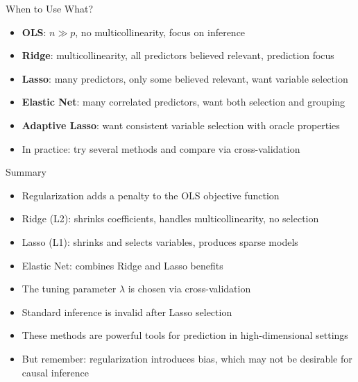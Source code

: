 \documentclass[aspectratio=169]{beamer}
\begin{document}
\begin{frame}{When to Use What?}
\begin{itemize}
    \item \textbf{OLS}: $n \gg p$, no multicollinearity, focus on inference
    \item \textbf{Ridge}: multicollinearity, all predictors believed relevant, prediction focus
    \item \textbf{Lasso}: many predictors, only some believed relevant, want variable selection
    \item \textbf{Elastic Net}: many correlated predictors, want both selection and grouping
    \item \textbf{Adaptive Lasso}: want consistent variable selection with oracle properties
    \item In practice: try several methods and compare via cross-validation
\end{itemize}
\end{frame}

\begin{frame}{Summary}
\begin{itemize}
    \item Regularization adds a penalty to the OLS objective function
    \item Ridge (L2): shrinks coefficients, handles multicollinearity, no selection
    \item Lasso (L1): shrinks and selects variables, produces sparse models
    \item Elastic Net: combines Ridge and Lasso benefits
    \item The tuning parameter $\lambda$ is chosen via cross-validation
    \item Standard inference is invalid after Lasso selection
    \item These methods are powerful tools for prediction in high-dimensional settings
    \item But remember: regularization introduces bias, which may not be desirable for causal inference
\end{itemize}
\end{frame}
\end{document}
